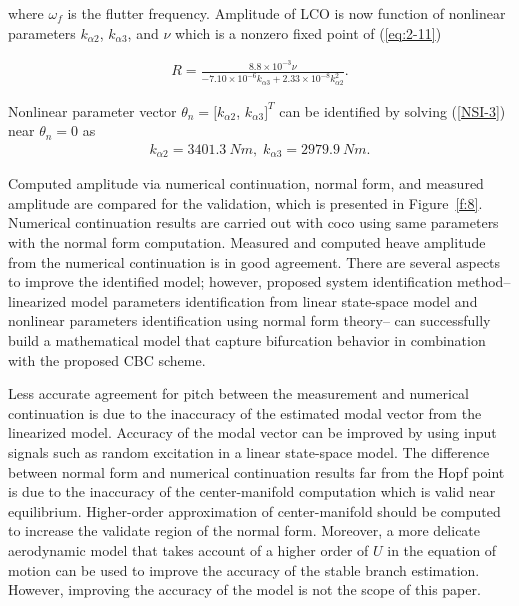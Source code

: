 \documentclass[openacc]{rsproca_new}%
\newcommand{\Eref}[1]{(\ref{#1})}
\newcommand{\Fref}[1]{Figure~\ref{#1}}
\begin{document}
\noindent where $\omega_f$ is the flutter frequency. Amplitude of LCO is now function of nonlinear parameters $k_{\alpha2}$, $k_{\alpha3}$, and $\nu$ which is a nonzero fixed point of \Eref{eq:2-11}

\begin{align}\label{eq:2-12}
R=\frac{8.8\times 10^{-3}\nu}{- 7.10 \times 10^{-6}  k_{\alpha 3} + 2.33 \times 10^{-8} k_{\alpha 2}^2}.
\end{align}

\noindent Nonlinear parameter vector $\theta_n=[k_{\alpha2}$, $k_{\alpha3}]^T$ can be identified by solving \Eref{NSI-3} near $\theta_n=0$ as
\begin{align}\label{eq:2-15}
k_{\alpha2}=3401.3 \: Nm, \; k_{\alpha3}=2979.9 \: Nm.
\end{align}

Computed amplitude via numerical continuation, normal form, and measured amplitude are compared for the validation, which is presented in \Fref{f:8}. Numerical continuation results are carried out with coco \cite{dankowicz2013recipes} using same parameters with the normal form computation. Measured and computed heave amplitude from the numerical continuation is in good agreement. There are several aspects to improve the identified model; however, proposed system identification method-- linearized model parameters identification from linear state-space model and nonlinear parameters identification using normal form theory-- can successfully build a mathematical model that capture bifurcation behavior in combination with the proposed CBC scheme.

Less accurate agreement for pitch between the measurement and numerical continuation is due to the inaccuracy of the estimated modal vector from the linearized model. Accuracy of the modal vector can be improved by using input signals such as random excitation in a linear state-space model. The difference between normal form and numerical continuation results far from the Hopf point is due to the inaccuracy of the center-manifold computation which is valid near equilibrium. Higher-order approximation of center-manifold should be computed to increase the validate region of the normal form. Moreover, a more delicate aerodynamic model that takes account of a higher order of $U$ in the equation of motion can be used to improve the accuracy of the stable branch estimation. However, improving the accuracy of the model is not the scope of this paper.
\end{document}
